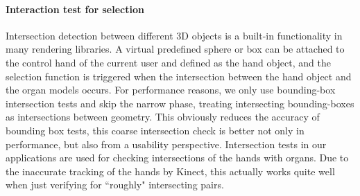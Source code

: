 \paragraph{Interaction test for selection}
Intersection detection between different 3D objects is a built-in functionality in many rendering libraries. A virtual predefined sphere or box can be attached to the control hand of the current user and defined as the hand object, and the selection function is triggered when the intersection between the hand object and the organ models occurs. 
For performance reasons, we only use bounding-box intersection tests and skip the narrow phase, treating intersecting bounding-boxes as intersections between geometry. This obviously reduces the accuracy of bounding box tests, this coarse intersection check is better not only in performance, but also from a usability perspective. Intersection tests in our applications are used for checking intersections of the hands with organs. Due to the inaccurate tracking of the hands by Kinect, this actually works quite well when just verifying for ``roughly" intersecting pairs.

